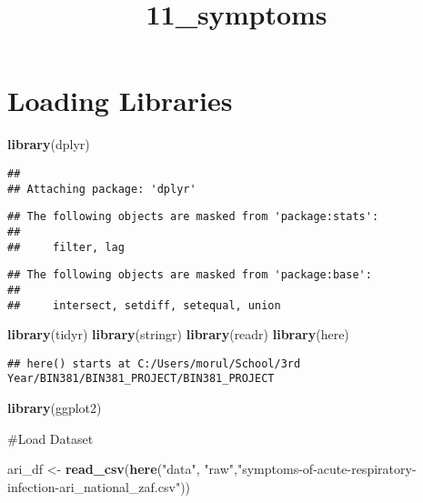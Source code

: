 \documentclass[
]{article}
\title{11\_symptoms}
\author{}
\date{\vspace{-2.5em}}
\newenvironment{Shaded}{\begin{snugshade}}{\end{snugshade}}
\newcommand{\FunctionTok}[1]{\textcolor[rgb]{0.13,0.29,0.53}{\textbf{#1}}}
\newcommand{\NormalTok}[1]{#1}
\newcommand{\OtherTok}[1]{\textcolor[rgb]{0.56,0.35,0.01}{#1}}
\newcommand{\StringTok}[1]{\textcolor[rgb]{0.31,0.60,0.02}{#1}}
\begin{document}
\maketitle

\section{Loading Libraries}\label{loading-libraries}

\begin{Shaded}
\begin{Highlighting}[]
\FunctionTok{library}\NormalTok{(dplyr)}
\end{Highlighting}
\end{Shaded}

\begin{verbatim}
## 
## Attaching package: 'dplyr'
\end{verbatim}

\begin{verbatim}
## The following objects are masked from 'package:stats':
## 
##     filter, lag
\end{verbatim}

\begin{verbatim}
## The following objects are masked from 'package:base':
## 
##     intersect, setdiff, setequal, union
\end{verbatim}

\begin{Shaded}
\begin{Highlighting}[]
\FunctionTok{library}\NormalTok{(tidyr)}
\FunctionTok{library}\NormalTok{(stringr)}
\FunctionTok{library}\NormalTok{(readr)}
\FunctionTok{library}\NormalTok{(here)}
\end{Highlighting}
\end{Shaded}

\begin{verbatim}
## here() starts at C:/Users/morul/School/3rd Year/BIN381/BIN381_PROJECT/BIN381_PROJECT
\end{verbatim}

\begin{Shaded}
\begin{Highlighting}[]
\FunctionTok{library}\NormalTok{(ggplot2)}
\end{Highlighting}
\end{Shaded}

\#Load Dataset

\begin{Shaded}
\begin{Highlighting}[]
\NormalTok{ari\_df }\OtherTok{\textless{}{-}} \FunctionTok{read\_csv}\NormalTok{(}\FunctionTok{here}\NormalTok{(}\StringTok{"data"}\NormalTok{, }\StringTok{"raw"}\NormalTok{,}\StringTok{"symptoms{-}of{-}acute{-}respiratory{-}infection{-}ari\_national\_zaf.csv"}\NormalTok{))}
\end{Highlighting}
\end{Shaded}
\end{document}

